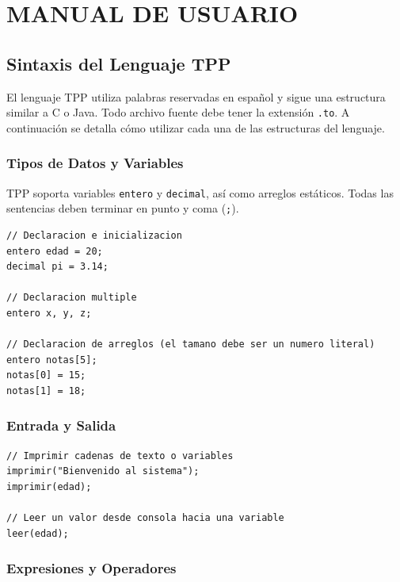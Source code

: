 \chapter{MANUAL DE USUARIO}

\section{Sintaxis del Lenguaje TPP}

El lenguaje TPP utiliza palabras reservadas en español y sigue una estructura similar a C o Java. Todo archivo fuente debe tener la extensión \texttt{.to}. A continuación se detalla cómo utilizar cada una de las estructuras del lenguaje.

\subsection{Tipos de Datos y Variables}

TPP soporta variables \texttt{entero} y \texttt{decimal}, así como arreglos estáticos. Todas las sentencias deben terminar en punto y coma (\texttt{;}).

\begin{lstlisting}[style=tppstyle, caption={Declaración de variables y arreglos}]
// Declaracion e inicializacion
entero edad = 20;
decimal pi = 3.14;

// Declaracion multiple
entero x, y, z;

// Declaracion de arreglos (el tamano debe ser un numero literal)
entero notas[5];
notas[0] = 15;
notas[1] = 18;
\end{lstlisting}

\subsection{Entrada y Salida}

\begin{lstlisting}[style=tppstyle, caption={Operaciones de Entrada y Salida}]
// Imprimir cadenas de texto o variables
imprimir("Bienvenido al sistema");
imprimir(edad);

// Leer un valor desde consola hacia una variable
leer(edad);
\end{lstlisting}

\subsection{Expresiones y Operadores}

